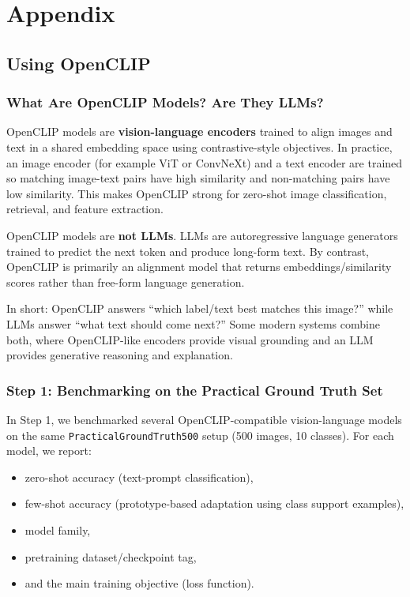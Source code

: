 \section{Appendix}
\subsection{Using OpenCLIP}
\subsubsection*{What Are OpenCLIP Models? Are They LLMs?}

OpenCLIP models are \textbf{vision-language encoders} trained to align images and text in a shared embedding space using contrastive-style objectives. In practice, an image encoder (for example ViT or ConvNeXt) and a text encoder are trained so matching image-text pairs have high similarity and non-matching pairs have low similarity. This makes OpenCLIP strong for zero-shot image classification, retrieval, and feature extraction.

OpenCLIP models are \textbf{not LLMs}. LLMs are autoregressive language generators trained to predict the next token and produce long-form text. By contrast, OpenCLIP is primarily an alignment model that returns embeddings/similarity scores rather than free-form language generation.

In short: OpenCLIP answers ``which label/text best matches this image?'' while LLMs answer ``what text should come next?'' Some modern systems combine both, where OpenCLIP-like encoders provide visual grounding and an LLM provides generative reasoning and explanation.

\subsubsection{Step 1: Benchmarking on the Practical Ground Truth Set}
In Step 1, we benchmarked several OpenCLIP-compatible vision-language models on the same \texttt{PracticalGroundTruth500} setup (500 images, 10 classes). For each model, we report:
\begin{itemize}
	\item zero-shot accuracy (text-prompt classification),
	\item few-shot accuracy (prototype-based adaptation using class support examples),
	\item model family,
	\item pretraining dataset/checkpoint tag,
	\item and the main training objective (loss function).
\end{itemize}

